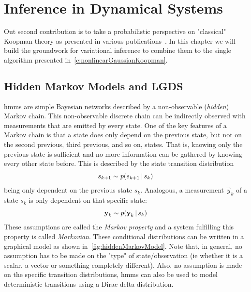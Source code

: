 \chapter{Inference in Dynamical Systems}
\label{c:inferenceInDynamicalSystems}



Out second contribution is to take a probabilistic perspective on "classical" Koopman theory as presented in various publications~\cite{bruntonKoopmanInvariantSubspaces2016,hanDeepLearningKoopman2020,kaiserDatadrivenDiscoveryKoopman2020,luschDeepLearningUniversal2018,williamsDataDrivenApproximation2015}. In this chapter we will build the groundwork for variational inference to combine them to the single \algname algorithm presented in~\autoref{c:nonlinearGaussianKoopman}.

\section{Hidden Markov Models and LGDS}
	\acp{hmm} are simple Bayesian networks described by a non-observable (\emph{hidden}) Markov chain. This non-observable discrete chain can be indirectly observed with measurements that are emitted by every state. One of the key features of a Markov chain is that a state does only depend on the previous state, but not on the second previous, third previous, and so on, states. That is, knowing only the previous state is sufficient and no more information can be gathered by knowing every other state before. This is described by the state transition distribution
	\begin{equation*}
		s_{k + 1} \sim p(s_{k + 1} \,\vert\, s_k)
	\end{equation*}
	being only dependent on the previous state \(s_k\). Analogous, a measurement \(\vec{y}_k\) of a state \(s_k\) is only dependent on that specific state:
	\begin{equation*}
		\boldsymbol{\mathrm{y}}_k \sim p(\boldsymbol{\mathrm{y}}_k \,\vert\, s_k)
	\end{equation*}
	These assumptions are called the \emph{Markov property} and a system fulfilling this property is called \emph{Markovian}. These conditional distributions can be written in a graphical model as shown in~\autoref{fig:hiddenMarkovModel}. Note that, in general, no assumption has to be made on the "type" of state/observation (\ac{ie} whether it is a scalar, a vector or something completely different). Also, no assumption is made on the specific transition distributions, \acp{hmm} can also be used to model deterministic transitions using a Dirac delta distribution.

